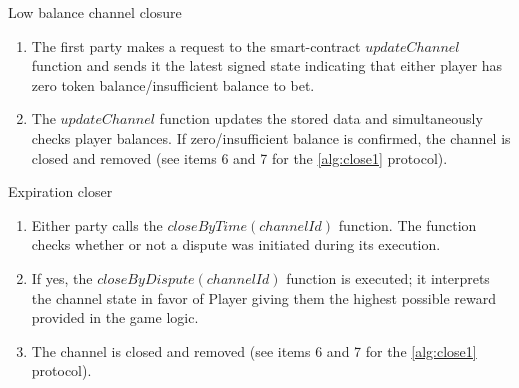 \begin{algorithm}
\caption{Low balance channel closure} \label{alg:close2}
\begin{enumerate}
	\item The first party makes a request to the smart-contract $updateChannel$ function and sends it the latest signed state indicating that either player has zero token balance/insufficient balance to bet.
	\item The $updateChannel$ function updates the stored data and simultaneously checks player balances. If zero/insufficient balance is confirmed, the channel is closed and removed (see items 6 and 7 for the \autoref{alg:close1} protocol).
\end{enumerate}
\end{algorithm}

\begin{algorithm}
\caption{Expiration closer} \label{alg:close3}
 \begin{enumerate}
	\item Either party calls the $closeByTime(channelId)$ function. The function checks whether or not a dispute was initiated during its execution.
	\item If yes, the $closeByDispute(channelId)$ function is executed; it interprets the channel state in favor of Player giving them the highest possible reward provided in the game logic. 
	\item The channel is closed and removed (see items 6 and 7 for the \autoref{alg:close1} protocol).
\end{enumerate}
\end{algorithm}

